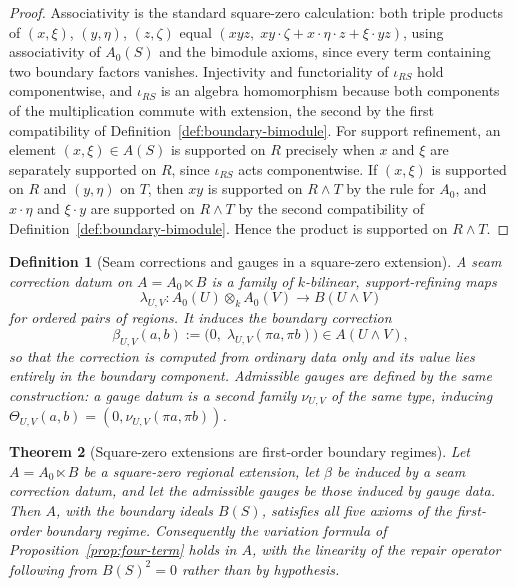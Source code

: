 \documentclass[11pt]{article}
\newtheorem{theorem}{Theorem}[section]
\newtheorem{definition}[theorem]{Definition}
\begin{document}
\begin{proof}
Associativity is the standard square-zero calculation: both triple products of \((x,\xi)\), \((y,\eta)\), \((z,\zeta)\) equal \((xyz,\;xy\cdot\zeta+x\cdot\eta\cdot z+\xi\cdot yz)\), using associativity of \(A_0(S)\) and the bimodule axioms, since every term containing two boundary factors vanishes. Injectivity and functoriality of \(\iota_{RS}\) hold componentwise, and \(\iota_{RS}\) is an algebra homomorphism because both components of the multiplication commute with extension, the second by the first compatibility of Definition~\ref{def:boundary-bimodule}. For support refinement, an element \((x,\xi)\in A(S)\) is supported on \(R\) precisely when \(x\) and \(\xi\) are separately supported on \(R\), since \(\iota_{RS}\) acts componentwise. If \((x,\xi)\) is supported on \(R\) and \((y,\eta)\) on \(T\), then \(xy\) is supported on \(R\wedge T\) by the rule for \(A_0\), and \(x\cdot\eta\) and \(\xi\cdot y\) are supported on \(R\wedge T\) by the second compatibility of Definition~\ref{def:boundary-bimodule}. Hence the product is supported on \(R\wedge T\).
\end{proof}

\begin{definition}[Seam corrections and gauges in a square-zero extension]
\label{def:seam-correction}
A seam correction datum on \(A=A_0\ltimes B\) is a family of \(k\)-bilinear, support-refining maps
\[
\lambda_{U,V}:A_0(U)\otimes_k A_0(V)\to B(U\wedge V)
\]
for ordered pairs of regions. It induces the boundary correction
\[
\beta_{U,V}(a,b):=\bigl(0,\;\lambda_{U,V}(\pi a,\pi b)\bigr)\in A(U\wedge V),
\]
so that the correction is computed from ordinary data only and its value lies entirely in the boundary component. Admissible gauges are defined by the same construction: a gauge datum is a second family \(\nu_{U,V}\) of the same type, inducing \(\Theta_{U,V}(a,b)=(0,\nu_{U,V}(\pi a,\pi b))\).
\end{definition}

\begin{theorem}[Square-zero extensions are first-order boundary regimes]
\label{thm:square-zero-regime}
Let \(A=A_0\ltimes B\) be a square-zero regional extension, let \(\beta\) be induced by a seam correction datum, and let the admissible gauges be those induced by gauge data. Then \(A\), with the boundary ideals \(B(S)\), satisfies all five axioms of the first-order boundary regime. Consequently the variation formula of Proposition~\ref{prop:four-term} holds in \(A\), with the linearity of the repair operator following from \(B(S)^2=0\) rather than by hypothesis.
\end{theorem}
\end{document}
